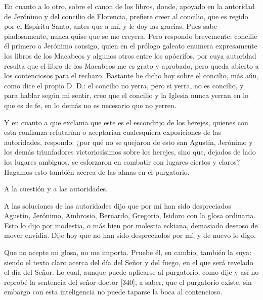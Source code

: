 En cuanto a lo otro, sobre el canon de los libros, donde, apoyado en la autoridad de Jerónimo y del concilio de Florencia, prefiere creer al concilio, que es regido por el Espíritu Santo, antes que a mí, y le doy las gracias. Pues sabe piadosamente, nunca quise que se me creyera. Pero respondo brevemente: concilie él primero a Jerónimo consigo, quien en el prólogo galeato enumera expresamente los libros de los Macabeos y algunos otros entre los apócrifos, por cuya autoridad resulta que el libro de los Macabeos me es grato y aprobado, pero queda abierto a los contenciosos para el rechazo. Bastante he dicho hoy sobre el concilio, más aún, como dice el propio D. D.: el concilio no yerra, pero si yerra, no es concilio, y para hablar según mi sentir, creo que el concilio y la Iglesia nunca yerran en lo que es de fe, en lo demás no es necesario que no yerren.

Y en cuanto a que exclama que este es el escondrijo de los herejes, quienes con esta confianza refutarían o aceptarían cualesquiera exposiciones de las autoridades, respondo: ¿por qué no se quejaron de esto san Agustín, Jerónimo y los demás triunfadores victoriosísimos sobre los herejes, sino que, dejados de lado los lugares ambiguos, se esforzaron en combatir con lugares ciertos y claros? Hagamos esto también acerca de las almas en el purgatorio.

A la cuestión y a las autoridades.

A las soluciones de las autoridades dijo que por mí han sido despreciados Agustín, Jerónimo, Ambrosio, Bernardo, Gregorio, Isidoro con la glosa ordinaria. Esto lo dijo por modestia, o más bien por molestia eckiana, demasiado deseoso de mover envidia. Dije hoy que no han sido despreciados por mí, y de nuevo lo digo.

Que no acepte mi glosa, no me importa. Pruebe él, en cambio, también la suya: siendo el texto claro acerca del día del Señor y del fuego, en el que será revelado el día del Señor. Lo cual, aunque puede aplicarse al purgatorio, como dije y así no reprobé la sentencia del señor doctor [340], a saber, que el purgatorio existe, sin embargo con esta inteligencia no puede taparse la boca al contencioso.

